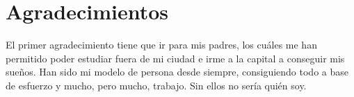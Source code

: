\documentclass[12pt,twoside,titlepage]{report}
\newcommand{\nombreautor}{Jesús Ramírez Gálvez}
\newcommand{\nombretutor}{Alfonso de Jesús Pérez Martínez}
\newcommand{\titulotrabajo}{EXPLOTACIÓN OFENSIVA DE ENTORNOS KUBERNETES MAL CONFIGURADOS UTILIZANDO POLÍTICAS DE KYVERNO}
\newcommand{\escuelalargo}{Escuela Técnica Superior de Ingeniería Informática}
\newcommand{\universidad}{Universidad Rey Juan Carlos}
\newcommand{\fecha}{Fecha}
\newcommand\blankpage{%
    \newpage
    \null
    \thispagestyle{empty}%
    \newpage}
\begin{document}








\hypersetup{pageanchor=true}

\normalsize
\afterpage{\blankpage} %






\setlength{\parskip}{0.75em}
\renewcommand{\baselinestretch}{1.25}

\setcounter{page}{2}



\chapter*{Agradecimientos}

El primer agradecimiento tiene que ir para mis padres, los cuáles me han permitido poder estudiar fuera de mi ciudad e irme a la capital a conseguir mis sueños. Han sido mi modelo de persona desde siempre, consiguiendo todo a base de esfuerzo y mucho, pero mucho, trabajo. Sin ellos no sería quién soy.
\end{document}
